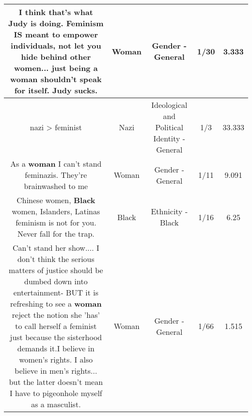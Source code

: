 \documentclass[11pt]{article}
\newlength\mylength
\begin{document}
\begin{center}
\begin{longtable}{|C{.65\mylength}|C{.30\mylength}|C{.12\mylength}|C{.12\mylength}|C{.12\mylength}|}
  \small I think that's what Judy is doing.  Feminism IS meant to empower individuals, not let you hide behind other women... just being a \textbf{woman} shouldn't speak for itself.  Judy sucks.\normalsize   & Woman & Gender - General & 1/30 & 3.333 \\  \hline
  \small nazi > feminist\normalsize   & Nazi &  Ideological and Political Identity - General & 1/3 & 33.333 \\  \hline
  \small As a \textbf{woman} I can't stand feminazis. They're brainwashed to me\normalsize   & Woman & Gender - General & 1/11 & 9.091 \\  \hline
  \small Chinese women, \textbf{Black} women, Islanders, Latinas feminism is not for you. Never fall for the trap.\normalsize   & Black & Ethnicity - Black & 1/16 & 6.25 \\  \hline
  \small Can't stand her show.... I don't think the serious matters of justice should be dumbed down into entertainment-  BUT it is refreshing to see a \textbf{woman} reject the notion she 'has' to call herself a feminist just because the sisterhood demands it.I believe in women's rights. I also believe in men's rights... but the latter doesn't mean I have to pigeonhole myself as a masculist.\normalsize   & Woman & Gender - General & 1/66 & 1.515 \\  \hline

\end{longtable}
\end{center}
\end{document}
